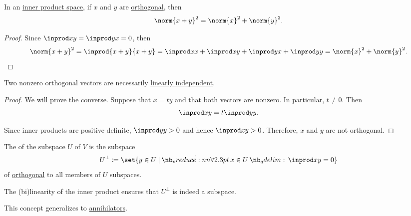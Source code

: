 \begin{theorem}\label{thm:generalized_pythagorean_theorem}
  In an \hyperref[def:inner_product_space]{inner product space}, if \( x \) and \( y \) are \hyperref[def:orthogonality]{orthogonal}, then
  \begin{equation*}
    \norm{x + y}^2 = \norm{x}^2 + \norm{y}^2.
  \end{equation*}
\end{theorem}
\begin{proof}
  Since \( \inprod x y = \inprod y x = 0 \), then
  \begin{equation*}
    \norm{x + y}^2
    =
    \inprod {x + y} {x + y}
    =
    \inprod x x + \inprod x y + \inprod y x + \inprod y y
    =
    \norm{x}^2 + \norm{y}^2.
  \end{equation*}
\end{proof}

\begin{proposition}\label{thm:orthogonal_implies_linearly_independent}
  Two nonzero orthogonal vectors are necessarily \hyperref[def:linear_dependence]{linearly independent}.
\end{proposition}
\begin{proof}
  We will prove the converse. Suppose that \( x = ty \) and that both vectors are nonzero. In particular, \( t \neq 0 \). Then
  \begin{equation*}
    \inprod x y = t \inprod y y.
  \end{equation*}

  Since inner products are positive definite, \( \inprod y y > 0 \) and hence \( \inprod x y > 0 \). Therefore, \( x \) and \( y \) are not orthogonal.
\end{proof}

\begin{definition}\label{def:orthogonal_complement}\mimprovised
  The  of the subspace \( U \) of \( V \) is the subspace
  \begin{equation*}
    U^\perp \coloneqq \set{ y \in U \given \qforall {x \in U} \inprod x y = 0 }
  \end{equation*}
  of \hyperref[def:orthogonality]{orthogonal} to all members of \( U \) subspaces.

  The (bi)linearity of the inner product ensures that \( U^\perp \) is indeed a subspace.

  This concept generalizes to \hyperref[def:orthogonal_complement]{annihilators}.
\end{definition}


